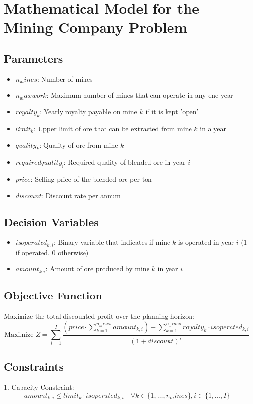 \documentclass{article}
\begin{document}
\section*{Mathematical Model for the Mining Company Problem}

\subsection*{Parameters}
\begin{itemize}
    \item $n_mines$: Number of mines
    \item $n_maxwork$: Maximum number of mines that can operate in any one year
    \item $royalty_k$: Yearly royalty payable on mine $k$ if it is kept 'open'
    \item $limit_k$: Upper limit of ore that can be extracted from mine $k$ in a year
    \item $quality_k$: Quality of ore from mine $k$
    \item $requiredquality_i$: Required quality of blended ore in year $i$
    \item $price$: Selling price of the blended ore per ton
    \item $discount$: Discount rate per annum
\end{itemize}

\subsection*{Decision Variables}
\begin{itemize}
    \item $isoperated_{k,i}$: Binary variable that indicates if mine $k$ is operated in year $i$ ($1$ if operated, $0$ otherwise)
    \item $amount_{k,i}$: Amount of ore produced by mine $k$ in year $i$
\end{itemize}

\subsection*{Objective Function}
Maximize the total discounted profit over the planning horizon:
\[
\text{Maximize } Z = \sum_{i=1}^{I} \frac{ (price \cdot \sum_{k=1}^{n_mines} amount_{k,i} ) - \sum_{k=1}^{n_mines} royalty_k \cdot isoperated_{k,i} }{(1 + discount)^i}
\]

\subsection*{Constraints}
1. Capacity Constraint:
\[
amount_{k,i} \leq limit_k \cdot isoperated_{k,i} \quad \forall k \in \{1, \ldots, n_mines\}, i \in \{1, \ldots, I\}
\]
\end{document}
